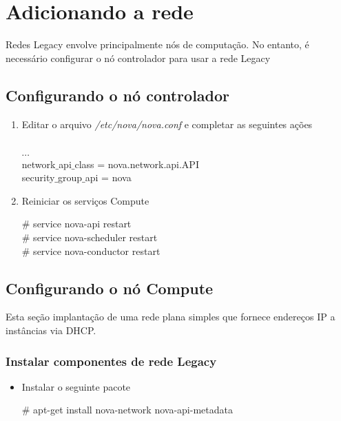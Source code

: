 \chapter{Adicionando a rede}
Redes Legacy envolve principalmente nós de computação. No entanto, é necessário configurar o nó controlador para usar a rede Legacy

\section{Configurando o nó controlador}
\begin{enumerate}
	\item Editar o arquivo \emph{/etc/nova/nova.conf} e completar as seguintes ações
	\begin{snugshade}
		[default]\\
		$\cdots$ \\
		network$\_$api$\_$class = nova.network.api.API \\
		security$\_$group$\_$api = nova
	\end{snugshade}
	
	\item Reiniciar os serviços Compute
	\begin{snugshade}
		\# service nova-api restart \\
		\# service nova-scheduler restart \\
		\# service nova-conductor restart \\
	\end{snugshade}
\end{enumerate}

\section{Configurando o nó Compute}
Esta seção  implantação de uma rede plana simples que fornece endereços IP a instâncias via DHCP.

\subsection{Instalar componentes de rede Legacy}
\begin{itemize}
	\item Instalar o seguinte pacote
	 \begin{snugshade}
		\# apt-get install nova-network nova-api-metadata
	\end{snugshade}
\end{itemize}

